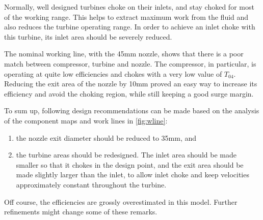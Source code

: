 Normally, well designed turbines choke on their inlets, and stay choked for most of the working range.
This helps to extract maximum work from the fluid and also reduces the turbine operating range. 
In order to achieve an inlet choke with this turbine, its inlet area should be severely reduced.

The nominal working line, with the 45mm nozzle, shows that there is a poor match between compressor, turbine and nozzle.
The compressor, in particular, is operating at quite low efficiencies and chokes with a very low value of $T_{04}$. 
Reducing the exit area of the nozzle by 10mm proved an easy way to increase its efficiency and avoid the choking region, while still keeping a good surge margin. 

To sum up, following design recommendations can be made based on the analysis of the component maps and work lines in \cref{fig:wline}:
\begin{enumerate}
    \item the nozzle exit diameter should be reduced to 35mm, and
    \item the turbine areas should be redesigned. The inlet area should be made smaller so that it chokes in the design point, and the exit area should be made slightly larger than the inlet, to allow inlet choke and keep velocities approximately constant throughout the turbine.
\end{enumerate}

Off course, the efficiencies are grossly overestimated in this model. Further refinements might change some of these remarks.

